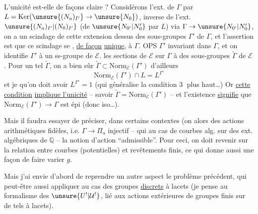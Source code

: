  L'unicité est-elle de  façons claire ?
 Considérons l'ext.  de
$\Gamma$ par $L=\mathrm{Ker}(\unsure{(N_a)_{I'}}\to\unsure{N_0})$,
 inverse de l'ext. $\unsure{(N_a)_{I'}|(N_0)_{I'}}$
(de $\unsure{N_{0'}|N_0'}$ par $L$) via $\Gamma\to\unsure{N_{0'}|N_0'}$, on
a un scindage  de cette extension  dessus
des sous-groupes $\Gamma'$ de $\Gamma$, et l'assertion est
que ce scindage se \uline{}, \uline{de façon} \uline{unique}, à $\Gamma$.
OPS $\Gamma'$ invariant dans $\Gamma$, et on
identifie $\Gamma'$ à un ss-groupe de $\mathcal{E}$. 
 les sections de $\mathcal{E}$ sur $\Gamma$ 
à des sous-groupes  $\widetilde{\Gamma}$ de $\mathcal{E}$.
Pour un tel $\widetilde{\Gamma}$, on a bien sûr
$\widetilde{\Gamma}\subset\mathrm{Norm}_{\mathcal{E}}(\Gamma')$
d'ailleurs  
\[
\mathrm{Norm}_{\mathcal{E}}(\Gamma')\cap L=L^{\Gamma'} \tag{31}
\]
et je  qu'on doit avoir
$L^{\Gamma'}=1$ (qui généralise la condition
\textcircled{3} plus haut\ldots) Or \uline{cette condition}
\uline{implique l'unicité} -- savoir
$\widetilde{\Gamma}=\mathrm{Norm}_{\mathcal{E}}(\Gamma')$ --
et l'existence \uline{signifie} que
$\mathrm{Norm}_{\mathcal{E}}(\Gamma')\to\Gamma$
est épi (donc iso\ldots).

Mais il faudra essayer de préciser,
dans certains contextes (on  alors des
actions arithmétiques fidèles, i.e. $\Gamma\to\Pi_a$
injectif -- qui  
au cas de courbes alg.  sur des
ext. algébriques de $\mathbb{Q}$ -- la notion
d'action ``admissible''. Pour ceci, on
doit revenir sur la relation entre
courbes (potentielles) et revêtements finis,
ce qui donne aussi une façon de
faire varier $g$.

Mais j'ai envie d'abord de reprendre
 un autre aspect  le problème
précédent, qui  peut-être aussi appliquer au cas des groupes \uline{discrets}
à lacets (je pense au formalisme
des $\unsure{U^!|\mathcal{U}^!}$, lié aux actions extérieures de
groupes finis sur de tels  à lacets).

